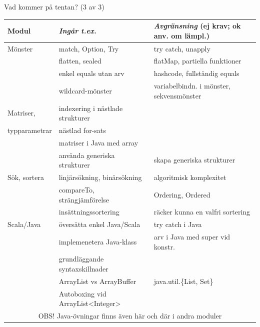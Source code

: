 \begin{Slide}{Vad kommer på tentan? (3 av 3)}\SlideFontTiny
\hspace{-2em}\begin{minipage}{1.0\textwidth}
\begin{tabular}{l | l | l}
\textbf{Modul} & \textit{Ingår t.ex.}& \textit{Avgränsning} (ej krav; ok anv. om lämpl.)\\\hline

Mönster     & match, Option, Try & try catch, unapply\\
            & flatten, sealed            & flatMap, partiella funktioner\\
            & enkel equals utan arv     & hashcode, fullständig equals   \\ 
            & wildcard-mönster  & variabelbindn. i mönster, sekvensmönster\\
\hline

Matriser,     & indexering i nästlade strukturer & \\
typparametrar & nästlad for-sats  & \\ 
              & matriser i Java med array  & \\
              & använda generiska strukturer & skapa generiska strukturer\\ 
\hline

Sök, sortera & linjärsökning, binärsökning & algoritmisk komplexitet\\
            & compareTo, strängjämförelse & Ordering, Ordered\\
            & insättningssortering & räcker kunna en valfri sortering \\
\hline


Scala/Java & översätta enkel Java/Scala & try catch i Java \\
           & implemenetera Java-klass     &  arv i Java med super vid konstr.\\
           & grundläggande syntaxskillnader & \\
           & ArrayList vs ArrayBuffer & java.util.\{List, Set\}\\
           & Autoboxing vid ArrayList<Integer> & \\
\multicolumn{3}{c}{OBS! Java-övningar finns även här och där i andra moduler}\\
\hline           
     
\end{tabular}
\end{minipage}
\end{Slide}


